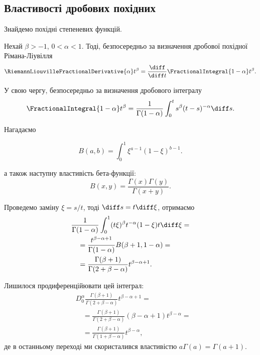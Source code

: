 \subsection{Властивості дробових похідних}
\begin{example}
    Знайдемо похідні степеневих функцій.
\end{example}
\begin{solution}
    Нехай $\beta > -1$, $0 < \alpha < 1$. Тоді, безпосередньо за визначення дробової похідної Рімана-Ліувілля
    \begin{equation}
        \RiemannLiouvilleFractionalDerivative{\alpha} t^\beta = \frac{\diff}{\diff t} \FractionalIntegral{1-\alpha} t^\beta.
    \end{equation}
    
    У свою чергу, безпосередньо за визначення дробового інтегралу
    \begin{equation}
        \FractionalIntegral{1-\alpha} t^\beta = \frac{1}{\Gamma(1 - \alpha)} \int_0^t s^\beta (t- s)^{-\alpha} \diff s.
    \end{equation}
    
    Нагадаємо
    \begin{definition}
        \begin{equation}
            B(a,b) = \int_0^1 \xi^{a-1}(1-\xi)^{b-1}.
        \end{equation}
    \end{definition}
    а також наступну властивість бета-функції:
    \begin{equation}
        B(x,y) = \frac {\Gamma (x) \Gamma (y)}{\Gamma (x + y)}.
    \end{equation}
    
    Проведемо заміну $\xi = s / t$, тоді $\diff s = t \diff \xi$, отримаємо
    \begin{equation}
        \begin{aligned}
            & \frac{1}{\Gamma(1-\alpha)} \int_0^1 (t \xi)^\beta t^{-\alpha} (1 - \xi) t \diff \xi = \\
            &\quad = \frac{t^{\beta - \alpha + 1}}{\Gamma(1 - \alpha)} B(\beta + 1, 1 - \alpha) = \\
            &\quad = \frac{\Gamma(\beta + 1)}{\Gamma(2 + \beta - \alpha)} t^{\beta - \alpha + 1}.
        \end{aligned}
    \end{equation}
    
    Лишилося продиференційювати цей інтеграл:
    \begin{equation}
        \begin{aligned}
            & D_0^\alpha \frac{\Gamma(\beta + 1)}{\Gamma(2 + \beta - \alpha)} t^{\beta - \alpha + 1} = \\
            &\quad = \frac{\Gamma(\beta + 1)}{\Gamma(2 + \beta - \alpha)} (\beta - \alpha + 1) t^{\beta - \alpha} = \\
            &\quad = \frac{\Gamma(\beta + 1)}{\Gamma(1 + \beta - \alpha)} t^{\beta - \alpha},
        \end{aligned}
    \end{equation}
    де в останньому переході ми скористалився властивістю $a \Gamma(a) = \Gamma(a + 1)$.
\end{solution}

